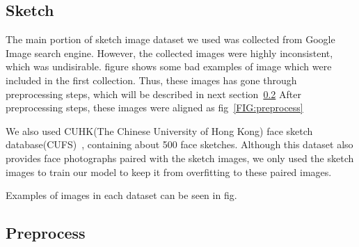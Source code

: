 \subsection{Sketch}

The main portion of sketch image dataset we used was collected from Google Image search engine. However, the collected images were highly inconsistent, which was undisirable. 
figure %
shows some bad examples of image which were included in the first collection. Thus, these images has gone through preprocessing steps, which will be described in next section~\ref{preprocess}
After preprocessing steps, these images were aligned as fig~\ref{FIG:preprocess}

We also used CUHK(The Chinese University of Hong Kong) face sketch database(CUFS)~\cite{CUHK_faces}, containing about 500 face sketches. 
Although this dataset also provides face photographs paired with the sketch images, we only used the sketch images to train our model to keep it from overfitting to these paired images.

Examples of images in each dataset can be seen in fig.%

\subsection{Preprocess}\label{preprocess}

